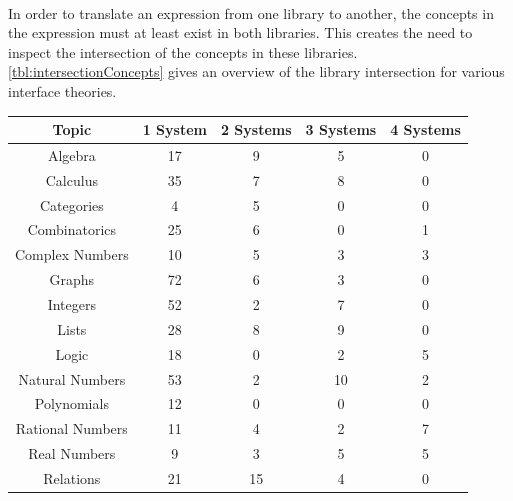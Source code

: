 \paragraph{}
In order to translate an expression from one library to another, the concepts in the expression must at least exist in both libraries. This creates the need to inspect the intersection of the concepts in these libraries.
\autoref{tbl:intersectionConcepts} gives an overview of the library intersection for various interface theories.
\begin{table}[ht]\centering\footnotesize	
	\begin{tabular}{|c|c|c|c|c|}
		\hline Topic & 1 System & 2 Systems & 3 Systems & 4 Systems\\
		\hline \textsf{Algebra}& \textsf{17} & \textsf{9} & \textsf{5} & \textsf{0}\\
		\hline \textsf{Calculus}& \textsf{35} & \textsf{7} & \textsf{8} & \textsf{0}  \\
		\hline \textsf{Categories} & \textsf{4} & \textsf{5} & \textsf{0} & \textsf{0}\\
		\hline \textsf{Combinatorics}& \textsf{25} & \textsf{6} & \textsf{0} & \textsf{1}  \\
		\hline \textsf{Complex Numbers} & \textsf{10} & \textsf{5} & \textsf{3} & \textsf{3}\\
		\hline \textsf{Graphs} & \textsf{72} & \textsf{6} & \textsf{3} & \textsf{0}\\
		\hline \textsf{Integers}& \textsf{52 }& \textsf{2 }& \textsf{7} & \textsf{0} \\
		\hline \textsf{Lists}& \textsf{28} & \textsf{8} & \textsf{9} & \textsf{0} \\
		\hline \textsf{Logic}& \textsf{18} & \textsf{0} & \textsf{2}& \textsf{5} \\
		\hline \textsf{Natural Numbers} & \textsf{53} & \textsf{2} & \textsf{10}& \textsf{2}  \\
		\hline \textsf{Polynomials} & \textsf{12} & \textsf{0} & \textsf{0}& \textsf{0}  \\
		\hline \textsf{Rational Numbers} & \textsf{11} & \textsf{4} & \textsf{2}& \textsf{7}  \\
		\hline \textsf{Real Numbers}  & \textsf{9} & \textsf{3} & \textsf{5} & \textsf{5}\\
		\hline \textsf{Relations}  & \textsf{21} & \textsf{15} & \textsf{4} & \textsf{0}\\

\end{tabular}
\end{table}
